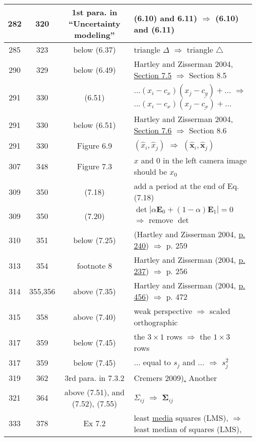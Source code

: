 \documentclass[10pt]{article}
\begin{document}
\begin{tabular}{|c|c|c|l|}
282 & 320 & 1st para. in ``Uncertainty modeling'' & (6.10) and 6.11) $\Rightarrow$ (6.10) and (6.11) \\\hline
285 & 323 & below (6.37) & triangle $\Delta$ $\Rightarrow$ triangle $\triangle$ \\\hline
290 & 329 & below (6.49) & Hartley and Zisserman 2004, \underline{Section 7.5} $\Rightarrow$ Section 8.5 \\\hline
291 & 330 & (6.51) & $... (x_i - c_x)(x_j - \underline{c_y}) + ...$ $\Rightarrow$ $... (x_i - c_x)(x_j - \underline{c_x}) + ...$ \\\hline
291 & 330 & below (6.51) & Hartley and Zisserman 2004, \underline{Section 7.6} $\Rightarrow$ Section 8.6 \\\hline
291 & 330 & Figure 6.9 & $(\hat{x}_i, \hat{x}_j)$ $\Rightarrow$ $(\boldsymbol{\hat{x}}_i, \boldsymbol{\hat{x}}_j)$ \\\hline
307 & 348 & Figure 7.3 & $x$ and 0 in the left camera image should be $x_0$ \\\hline
309 & 350 & (7.18) & add a period at the end of Eq.(7.18) \\\hline
309 & 350 & (7.20) & $\det |\alpha \boldsymbol{E}_0 + (1-\alpha)\boldsymbol{E}_1|=0$ $\Rightarrow$ remove $\det$ \\\hline
310 & 351 & below (7.25) & (Hartley and Zisserman 2004, \underline{p. 240}) $\Rightarrow$ p. 259 \\\hline
313 & 354 & footnote 8 & Hartley and Zisserman (2004, \underline{p. 237}) $\Rightarrow$ p. 256 \\\hline
314 & 355,356 & above (7.35) & Hartley and Zisserman (2004, \underline{p. 456}) $\Rightarrow$ p. 472 \\\hline
315 & 358 & above (7.40) & weak perspective $\Rightarrow$ scaled orthographic \\\hline
317 & 359 & below (7.45) & the $3 \times 1$ rows $\Rightarrow$ the $1 \times 3$ rows \\\hline
317 & 359 & below (7.45) & ... equal to \underline{$s_j$} and ... $\Rightarrow$ $s_j^2$ \\\hline
319 & 362 & 3rd para. in 7.3.2 & Cremers 2009)\underline{.} Another \\\hline
321 & 364 & above (7.51), and (7.52), (7.55) & $\Sigma_{ij}$ $\Rightarrow$ $\boldsymbol{\Sigma}_{ij}$ \\\hline
333 & 378 & Ex 7.2 & least \underline{media} squares (LMS), $\Rightarrow$ least median of squares (LMS), \\\hline
\end{tabular}
\end{document}
